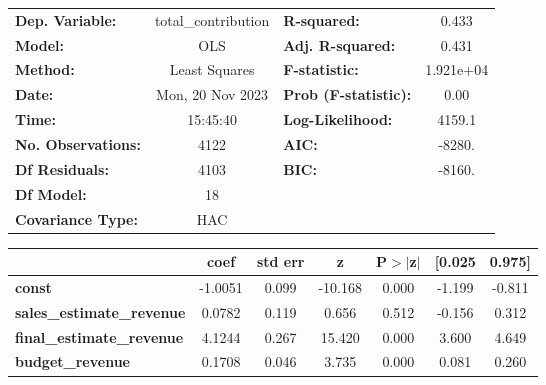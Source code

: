 \begin{center}
\begin{tabular}{lclc}
\toprule
\textbf{Dep. Variable:}                     & total\_contribution & \textbf{  R-squared:         } &     0.433   \\
\textbf{Model:}                             &         OLS         & \textbf{  Adj. R-squared:    } &     0.431   \\
\textbf{Method:}                            &    Least Squares    & \textbf{  F-statistic:       } & 1.921e+04   \\
\textbf{Date:}                              &   Mon, 20 Nov 2023  & \textbf{  Prob (F-statistic):} &     0.00    \\
\textbf{Time:}                              &       15:45:40      & \textbf{  Log-Likelihood:    } &    4159.1   \\
\textbf{No. Observations:}                  &          4122       & \textbf{  AIC:               } &    -8280.   \\
\textbf{Df Residuals:}                      &          4103       & \textbf{  BIC:               } &    -8160.   \\
\textbf{Df Model:}                          &            18       & \textbf{                     } &             \\
\textbf{Covariance Type:}                   &         HAC         & \textbf{                     } &             \\
\bottomrule
\end{tabular}
\begin{tabular}{lcccccc}
                                            & \textbf{coef} & \textbf{std err} & \textbf{z} & \textbf{P$> |$z$|$} & \textbf{[0.025} & \textbf{0.975]}  \\
\midrule
\textbf{const}                              &      -1.0051  &        0.099     &   -10.168  &         0.000        &       -1.199    &       -0.811     \\
\textbf{sales\_estimate\_revenue}           &       0.0782  &        0.119     &     0.656  &         0.512        &       -0.156    &        0.312     \\
\textbf{final\_estimate\_revenue}           &       4.1244  &        0.267     &    15.420  &         0.000        &        3.600    &        4.649     \\
\textbf{budget\_revenue}                    &       0.1708  &        0.046     &     3.735  &         0.000        &        0.081    &        0.260     \\

\end{tabular}
\end{center}
